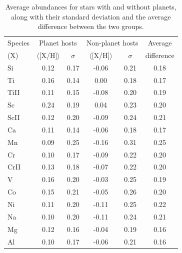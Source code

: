 \documentclass[dvips,12pt,a4paper]{report}
\begin{document}
{{\begin{table}[h!]\footnotesize
\label {avgabund}
\centering
\caption[Average abundances for stars with and without planets ]{Average abundances for stars with and without planets, along with their standard deviation and the average difference between the two groups.} 
\begin{tabular}{ l c c c c c}

\hline
\hline 
Species & \multicolumn {2}{c}{Planet hosts} & \multicolumn {2}{c}{Non-planet hosts} & Average  \\
(X) & $\langle$[X/H]$\rangle$ & $\sigma$ & $\langle$[X/H]$\rangle$ & $\sigma$ & difference \\
\hline
          Si & 0.12 & 0.17 & -0.06 & 0.21 & 0.18 \\
          Ti & 0.16 & 0.14 & 0.00 & 0.18 & 0.17 \\
        TiII & 0.11 & 0.15 & -0.08 & 0.20 & 0.19\\
          Sc & 0.24 & 0.19 & 0.04 & 0.23 & 0.20\\
        ScII & 0.12 & 0.20 & -0.09 & 0.24 & 0.21\\
          Ca & 0.11 & 0.14 & -0.06 & 0.18 & 0.17\\
          Mn & 0.09 & 0.25 & -0.16 & 0.31 & 0.25\\
          Cr & 0.10 & 0.17 & -0.09 & 0.22 & 0.20\\
        CrII & 0.13 & 0.18 & -0.07 & 0.22 & 0.20\\
           V & 0.16 & 0.20 & -0.03 & 0.25 & 0.19\\
          Co & 0.15 & 0.21 & -0.05 & 0.26 & 0.20\\
          Ni & 0.11 & 0.20 & -0.11 & 0.25 & 0.22\\
          Na & 0.10 & 0.20 & -0.11 & 0.24 & 0.21\\
          Mg & 0.12 & 0.16 & -0.04 & 0.19 & 0.16\\
          Al & 0.10 & 0.17 & -0.06 & 0.21 & 0.16\\
\hline

\end{tabular}
\end{table}

}}
\end{document}
